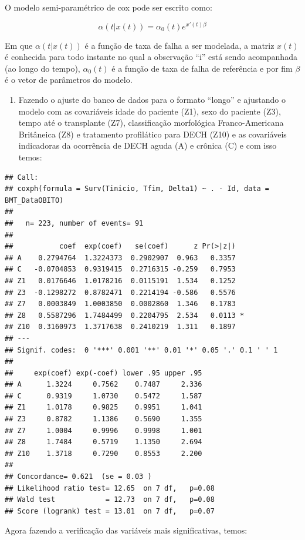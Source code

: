 \documentclass[]{article}
\providecommand{\tightlist}{%
  \setlength{\itemsep}{0pt}\setlength{\parskip}{0pt}}
\begin{document}
O modelo semi-paramétrico de cox pode ser escrito como:

\[\alpha(t|x(t))=\alpha_0(t)e^{x'(t)\beta}\]

Em que \(\alpha(t|x(t))\) é a função de taxa de falha a ser modelada, a
matriz \(x(t)\) é conhecida para todo instante no qual a observação
``i'' está sendo acompanhada (ao longo do tempo), \(\alpha_0(t)\) é a
função de taxa de falha de referência e por fim \(\beta\) é o vetor de
parâmetros do modelo.

\begin{enumerate}
\def\labelenumi{\alph{enumi})}
\setcounter{enumi}{1}
\tightlist
\item
  Fazendo o ajuste do banco de dados para o formato ``longo'' e
  ajustando o modelo com as covariáveis idade do paciente (Z1), sexo do
  paciente (Z3), tempo até o transplante (Z7), classificação morfológica
  Franco-Americana Britâneica (Z8) e tratamento profilático para DECH
  (Z10) e as covariáveis indicadoras da ocorrência de DECH aguda (A) e
  crônica (C) e com isso temos:
\end{enumerate}

\begin{verbatim}
## Call:
## coxph(formula = Surv(Tinicio, Tfim, Delta1) ~ . - Id, data = BMT_DataOBITO)
## 
##   n= 223, number of events= 91 
## 
##           coef  exp(coef)   se(coef)      z Pr(>|z|)  
## A    0.2794764  1.3224373  0.2902907  0.963   0.3357  
## C   -0.0704853  0.9319415  0.2716315 -0.259   0.7953  
## Z1   0.0176646  1.0178216  0.0115191  1.534   0.1252  
## Z3  -0.1298272  0.8782471  0.2214194 -0.586   0.5576  
## Z7   0.0003849  1.0003850  0.0002860  1.346   0.1783  
## Z8   0.5587296  1.7484499  0.2204795  2.534   0.0113 *
## Z10  0.3160973  1.3717638  0.2410219  1.311   0.1897  
## ---
## Signif. codes:  0 '***' 0.001 '**' 0.01 '*' 0.05 '.' 0.1 ' ' 1
## 
##     exp(coef) exp(-coef) lower .95 upper .95
## A      1.3224     0.7562    0.7487     2.336
## C      0.9319     1.0730    0.5472     1.587
## Z1     1.0178     0.9825    0.9951     1.041
## Z3     0.8782     1.1386    0.5690     1.355
## Z7     1.0004     0.9996    0.9998     1.001
## Z8     1.7484     0.5719    1.1350     2.694
## Z10    1.3718     0.7290    0.8553     2.200
## 
## Concordance= 0.621  (se = 0.03 )
## Likelihood ratio test= 12.65  on 7 df,   p=0.08
## Wald test            = 12.73  on 7 df,   p=0.08
## Score (logrank) test = 13.01  on 7 df,   p=0.07
\end{verbatim}

Agora fazendo a verificação das variáveis mais significativas, temos:
\end{document}

